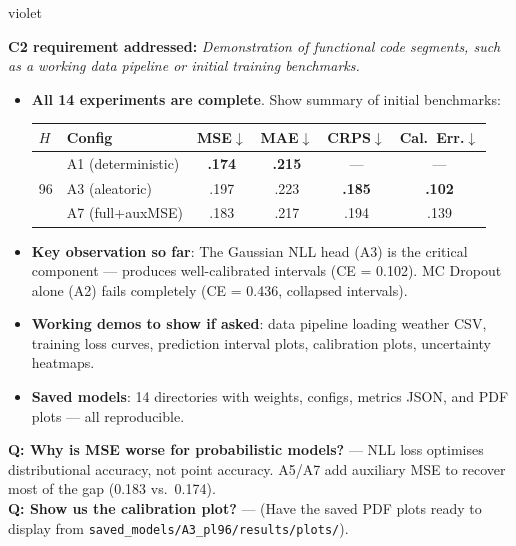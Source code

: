 \documentclass[11pt,a4paper]{article}
\begin{document}
\begin{speakerbox}{violet}

\textbf{C2 requirement addressed:} \textit{Demonstration of functional code segments, such as a working data pipeline or initial training benchmarks.}

\begin{talkingpoints}
\begin{itemize}[leftmargin=*]
    \item \textbf{All 14 experiments are complete}. Show summary of initial benchmarks:

    \begin{center}
    \footnotesize
    \setlength{\tabcolsep}{3pt}
    \begin{tabular}{@{}ll|cc|cc@{}}
    \toprule
    $H$ & Config & MSE$\downarrow$ & MAE$\downarrow$ & CRPS$\downarrow$ & Cal.\ Err.$\downarrow$ \\
    \midrule
    \multirow{3}{*}{96}
    & A1 (deterministic) & \textbf{.174} & \textbf{.215} & --- & --- \\
    & A3 (aleatoric) & .197 & .223 & \textbf{.185} & \textbf{.102} \\
    & A7 (full+auxMSE) & .183 & .217 & .194 & .139 \\
    \bottomrule
    \end{tabular}
    \end{center}

    \item \textbf{Key observation so far}: The Gaussian NLL head (A3) is the critical component --- produces well-calibrated intervals (CE = 0.102). MC Dropout alone (A2) fails completely (CE = 0.436, collapsed intervals).
    \item \textbf{Working demos to show if asked}: data pipeline loading weather CSV, training loss curves, prediction interval plots, calibration plots, uncertainty heatmaps.
    \item \textbf{Saved models}: 14 directories with weights, configs, metrics JSON, and PDF plots --- all reproducible.
\end{itemize}
\end{talkingpoints}

\begin{anticipatedqa}
\textbf{Q: Why is MSE worse for probabilistic models?} --- NLL loss optimises distributional accuracy, not point accuracy. A5/A7 add auxiliary MSE to recover most of the gap (0.183 vs.\ 0.174). \\
\textbf{Q: Show us the calibration plot?} --- (Have the saved PDF plots ready to display from \texttt{saved\_models/A3\_pl96/results/plots/}).
\end{anticipatedqa}

\end{speakerbox}
\end{document}
